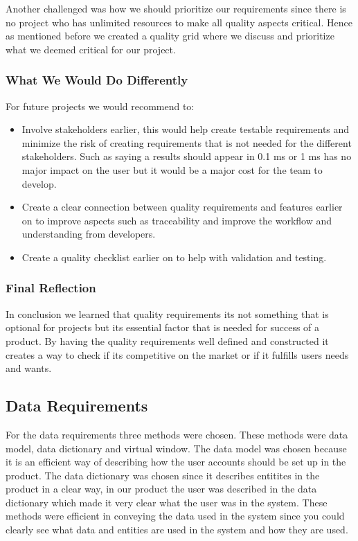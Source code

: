 Another challenged was how we should prioritize our requirements since there is no project who has unlimited resources to make all quality aspects critical. Hence as mentioned before we created a quality grid where we discuss and prioritize what we deemed critical for our project.


\subsubsection{What We Would Do Differently}
For future projects we would recommend to:
\begin{itemize}
    \item Involve stakeholders earlier, this would help create testable requirements and minimize the risk of creating requirements that is not needed for the different stakeholders. Such as saying a results should appear in 0.1 ms or 1 ms has no major impact on the user but it would be a major cost for the team to develop.
    \item Create a clear connection between quality requirements and features earlier on to improve aspects such as traceability and improve the workflow and understanding from developers.
    \item Create a quality checklist earlier on to help with validation and testing.
\end{itemize}

\subsubsection{Final Reflection}
In conclusion we learned that quality requirements its not something that is optional for projects but its essential factor that is needed for success of a product. By having the quality requirements well defined and constructed it creates a way to check if its competitive on the market or if it fulfills users needs and wants.



\subsection{Data Requirements}

For the data requirements three methods were chosen. These methods were data model, data dictionary and virtual window. The data model was chosen because it is an efficient
way of describing how the user accounts should be set up in the product. The data dictionary was chosen since it describes entitites in the product in a clear way, in our product the
user was described in the data dictionary which made it very clear what the user was in the system. These methods were efficient in conveying the data used in the system since you could
clearly see what data and entities are used in the system and how they are used.

